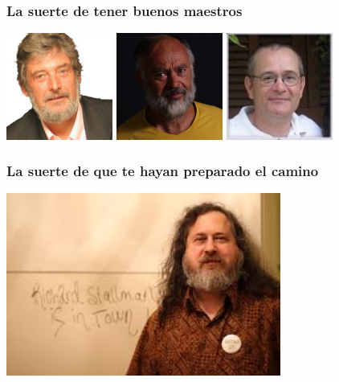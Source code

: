 \begin{frame}[fragile]
  \frametitle{La suerte de tener buenos maestros}

  \begin{center}
  \includegraphics[height=3.5cm]{figs/foto-aalvarez}
  \includegraphics[height=3.5cm]{figs/foto-jseoane}
  \includegraphics[height=3.5cm]{figs/foto-sarevalo}
  \end{center}  
  
\end{frame}

\begin{frame}[fragile]
  \frametitle{La suerte de que te hayan preparado el camino}

  \begin{center}
  \includegraphics[height=6cm]{figs/foto-rms}
  \end{center}  
  
\end{frame}

